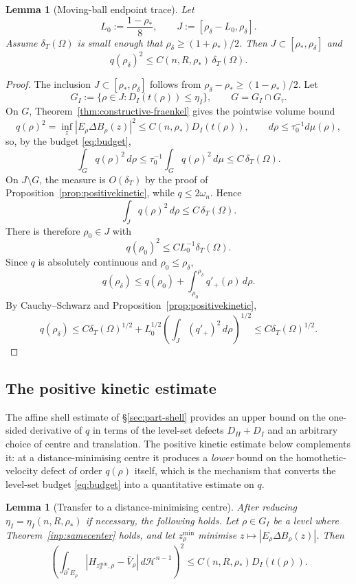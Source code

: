 \documentclass[11pt]{amsart}
\newtheorem{lemma}[theorem]{Lemma}
\theoremstyle{definition}
\newcommand{\Om}{\Omega}
\newcommand{\dT}{\delta_T}
\newcommand{\rstar}{\rho_*}
\newcommand{\rdel}{\rho_\delta}
\newcommand{\Hn}{\mathcal H^{n-1}}
\begin{document}
\begin{lemma}[Moving-ball endpoint trace]
\label{lem:endpoint}
Let
\[
   L_0:=\frac{1-\rstar}{8},\qquad
   J:=[\rdel-L_0,\rdel].
\]
Assume \(\dT(\Om)\) is small enough that
\(\rdel\ge(1+\rstar)/2\).  Then \(J\subset[\rstar,\rdel]\) and
\[
   q(\rdel)^2\le C(n,R,\rstar)\,\dT(\Om).
\]
\end{lemma}

\begin{proof}
The inclusion \(J\subset[\rstar,\rdel]\) follows from
\(\rdel-\rstar\ge(1-\rstar)/2\).  Let
\[
   G_I:=\{\rho\in J:D_I(t(\rho))\le\eta_I\},
   \qquad G=G_I\cap G_\tau .
\]
On \(G\), Theorem~\ref{thm:constructive-fraenkel} gives the pointwise volume
bound
\[
   q(\rho)^2=\inf_z|E_\rho\Delta B_\rho(z)|^2\le C(n,\rstar)D_I(t(\rho)),
   \qquad d\rho\le\tau_0^{-1}d\mu(\rho),
\]
so, by the budget \eqref{eq:budget},
\[
   \int_G q(\rho)^2\,d\rho\le\tau_0^{-1}\!\int_G q(\rho)^2\,d\mu\le C\,\dT(\Om).
\]
On \(J\setminus G\), the measure is \(O(\dT)\) by the proof of
Proposition~\ref{prop:positivekinetic}, while \(q\le2\omega_n\).  Hence
\[
   \int_J q(\rho)^2\,d\rho\le C\,\dT(\Om).
\]
There is therefore \(\rho_0\in J\) with
\[
   q(\rho_0)^2\le C L_0^{-1}\dT(\Om).
\]
Since \(q\) is absolutely continuous and \(\rho_0\le\rdel\),
\[
   q(\rdel)
   \le q(\rho_0)+\int_{\rho_0}^{\rdel}q'_+(\rho)\,d\rho.
\]
By Cauchy--Schwarz and Proposition~\ref{prop:positivekinetic},
\[
   q(\rdel)
   \le C\dT(\Om)^{1/2}
      +L_0^{1/2}\left(\int_J(q'_+)^2\,d\rho\right)^{1/2}
   \le C\dT(\Om)^{1/2}.
\]
\end{proof}

\subsection{The positive kinetic estimate}\label{sec:part-kinetic}\label{sec:kinetic}

The affine shell estimate of \S\ref{sec:part-shell} provides an upper
bound on the one-sided derivative of \(q\) in terms of the level-set
defects \(D_H+D_I\) and an arbitrary choice of centre and translation.
The positive kinetic estimate below complements it: at a
distance-minimising centre it produces a \emph{lower} bound on the
homothetic-velocity defect of order \(q(\rho)\) itself, which is the
mechanism that converts the level-set budget \eqref{eq:budget} into a
quantitative estimate on \(q\).

\begin{lemma}[Transfer to a distance-minimising centre]\label{lem:center-transfer}
After reducing \(\eta_I=\eta_I(n,R,\rstar)\) if necessary, the following
holds.  Let \(\rho\in G_I\) be a level where
Theorem~\ref{inp:samecenter} holds, and let \(z_\rho^{\min}\) minimise
\(z\mapsto |E_\rho\Delta B_\rho(z)|\).  Then
\begin{equation}\label{eq:H-DI-min}
   \left(
   \int_{\partial^*E_\rho}
      |H_{z_\rho^{\min},\rho}-\bar V_\rho|\,d\Hn
   \right)^2
   \le C(n,R,\rstar)D_I(t(\rho)).
\end{equation}
\end{lemma}
\end{document}
